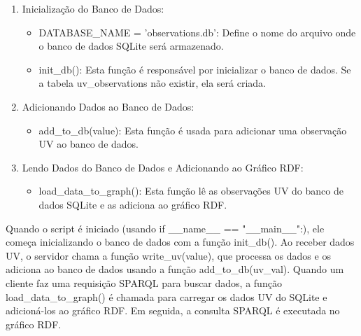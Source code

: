 \begin{enumerate}
    \item Inicialização do Banco de Dados:
        \begin{itemize}
            \item DATABASE\_NAME = 'observations.db': Define o nome do arquivo onde o banco de dados SQLite será armazenado.
            \item init\_db(): Esta função é responsável por inicializar o banco de dados. Se a tabela uv\_observations não existir, ela será criada.
        \end{itemize}
    \item Adicionando Dados ao Banco de Dados:
        \begin{itemize}
            \item add\_to\_db(value): Esta função é usada para adicionar uma observação UV ao banco de dados.
        \end{itemize}
    \item Lendo Dados do Banco de Dados e Adicionando ao Gráfico RDF:
        \begin{itemize}
            \item load\_data\_to\_graph(): Esta função lê as observações UV do banco de dados SQLite e as adiciona ao gráfico RDF.
        \end{itemize}
\end{enumerate}

    Quando o script é iniciado (usando if \_\_name\_\_ == "\_\_main\_\_":), ele começa inicializando o banco de dados com a função init\_db().
    Ao receber dados UV, o servidor chama a função write\_uv(value), que processa os dados e os adiciona ao banco de dados usando a função add\_to\_db(uv\_val).
    Quando um cliente faz uma requisição SPARQL para buscar dados, a função load\_data\_to\_graph() é chamada para carregar os dados UV do SQLite e adicioná-los ao gráfico RDF. Em seguida, a consulta SPARQL é executada no gráfico RDF.
